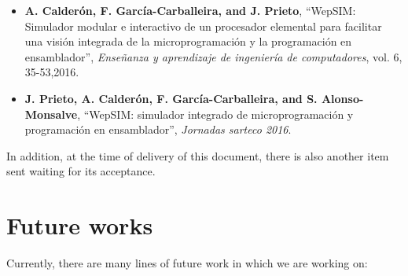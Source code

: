 \begin{itemize}

\item \textbf{A. Calderón, F. García-Carballeira, and J. Prieto}, “WepSIM: Simulador modular e interactivo de un procesador elemental para facilitar una visión integrada de la microprogramación y la programación en ensamblador”, \textit{Enseñanza y aprendizaje de ingeniería de computadores}, vol. 6, 35-53,2016. \cite{mateos2016wepsim}

\item \textbf{J. Prieto, A. Calderón, F. García-Carballeira, and S. Alonso-Monsalve}, “WepSIM: simulador integrado de microprogramación y programación en ensamblador”, \textit{Jornadas sarteco 2016}. \cite{arcos2032}

\end{itemize}

In addition, at the time of delivery of this document, there is also another item sent waiting for its acceptance.

\clearpage

\section*{Future works}

Currently, there are many lines of future work in which we are working on:


